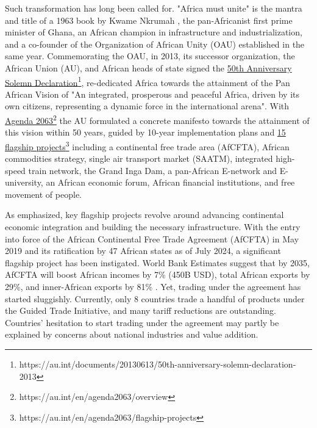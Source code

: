 \documentclass[a4paper]{article}
\begin{document}
Such transformation has long been called for. "Africa must unite" is the mantra and title of a 1963 book by Kwame Nkrumah \citep{nkrumah1963africa}, the pan-Africanist first prime minister of Ghana, an African champion in infrastructure and industrialization, and a co-founder of the Organization of African Unity (OAU) established in the same year. Commemorating the OAU, in 2013, its successor organization, the African Union (AU), and African heads of state signed the \href{https://au.int/documents/20130613/50th-anniversary-solemn-declaration-2013}{50th Anniversary Solemn Declaration}\footnote{https://au.int/documents/20130613/50th-anniversary-solemn-declaration-2013}, re-dedicated Africa towards the attainment of the Pan African Vision of "An integrated, prosperous and peaceful Africa, driven by its own citizens, representing a dynamic force in the international arena". With \href{https://au.int/en/agenda2063/overview}{Agenda 2063}\footnote{https://au.int/en/agenda2063/overview} the AU formulated a concrete manifesto towards the attainment of this vision within 50 years, guided by 10-year implementation plans and \href{https://au.int/en/agenda2063/flagship-projects}{15 flagship projects}\footnote{https://au.int/en/agenda2063/flagship-projects} including a continental free trade area (AfCFTA), African commodities strategy, single air transport market (SAATM), integrated high-speed train network, the Grand Inga Dam, a pan-African E-network and E-university, an African economic forum, African financial institutions, and free movement of people. \newline 

As emphasized, key flagship projects revolve around advancing continental economic integration and building the necessary infrastructure. With the entry into force of the African Continental Free Trade Agreement (AfCFTA) in May 2019 and its ratification by 47 African states as of July 2024, a significant flagship project has been instigated. World Bank Estimates suggest that by 2035, AfCFTA will boost African incomes by 7\% (450B USD), total African exports by 29\%, and inner-African exports by 81\% \citep{worldbank2020afcfta}. Yet, trading under the agreement has started sluggishly. Currently, only 8 countries trade a handful of products under the Guided Trade Initiative, and many tariff reductions are outstanding. Countries' hesitation to start trading under the agreement may partly be explained by concerns about national industries and value addition.  \newline 
\end{document}
